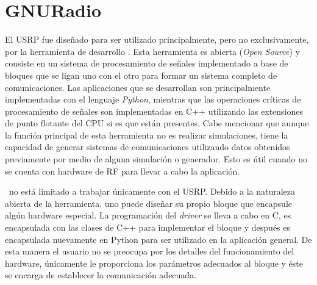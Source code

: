 
\section{GNURadio}
\label{sec:gnuradio}

El USRP fue dise\~nado para ser utilizado principalmente, pero no
exclusivamente, por la herramienta de desarrollo \gnuradio. Esta
herramienta es abierta (\emph{Open Source}) y consiste en un sistema de
procesamiento de se\~nales implementado a base de bloques que se ligan uno con
el otro para formar un sistema completo de comunicaciones. Las aplicaciones que
se desarrollan son principalmente implementadas con el lenguaje \emph{Python}, mientras
que las operaciones cr\'iticas de procesamiento de se\~nales son implementadas
en C++ utilizando las extensiones de punto flotante del CPU si es que est\'an
presentes. Cabe mencionar que aunque la funci\'on principal de esta herramienta
no es realizar simulaciones, tiene la capacidad de generar sistemas de
comunicaciones utilizando datos obtenidos previamente por medio de alguna
simulaci\'on o generador. Esto es \'util cuando no se cuenta con hardware de RF
para llevar a cabo la aplicaci\'on.

\gnuradio\ no est\'a limitado a trabajar \'unicamente con el USRP. Debido a
la naturaleza abierta de la herramienta, uno puede dise\~nar su propio bloque
que encapsule alg\'un hardware especial. La programaci\'on del \emph{driver} se lleva a
cabo en C, es encapsulada con las clases de C++ para implementar el bloque y
despu\'es es encapsulada nuevamente en Python para ser utilizado en la
aplicaci\'on general. De esta manera el usuario no se preocupa por los detalles
del funcionamiento del hardware, \'unicamente le proporciona los par\'ametros
adecuados al bloque y \'este se encarga de establecer la comunicaci\'on adecuada.

